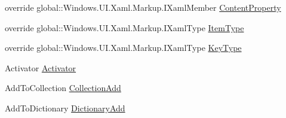 \begin{CompactItemize}
\item 
override global::Windows.UI.Xaml.Markup.IXamlMember \hyperlink{class__2doo_1_1_u_w_p_1_1__2doo___u_w_p___xaml_type_info_1_1_xaml_user_type_d0c85afa9c18e71a3d2850f49873bd0c}{ContentProperty}
\item 
override global::Windows.UI.Xaml.Markup.IXamlType \hyperlink{class__2doo_1_1_u_w_p_1_1__2doo___u_w_p___xaml_type_info_1_1_xaml_user_type_6c8b29ce9e51ab0c845f131f8e6e9f98}{ItemType}
\item 
override global::Windows.UI.Xaml.Markup.IXamlType \hyperlink{class__2doo_1_1_u_w_p_1_1__2doo___u_w_p___xaml_type_info_1_1_xaml_user_type_ab70ce45012ade9ca21825136d066410}{KeyType}
\item 
Activator \hyperlink{class__2doo_1_1_u_w_p_1_1__2doo___u_w_p___xaml_type_info_1_1_xaml_user_type_aec8bf9d82d32de8ec3a338ac1a4d641}{Activator}
\item 
AddToCollection \hyperlink{class__2doo_1_1_u_w_p_1_1__2doo___u_w_p___xaml_type_info_1_1_xaml_user_type_59a717ad24efc37521ee5641ce8bcd83}{CollectionAdd}
\item 
AddToDictionary \hyperlink{class__2doo_1_1_u_w_p_1_1__2doo___u_w_p___xaml_type_info_1_1_xaml_user_type_8296e230a21290dc57a45f996baa74d3}{DictionaryAdd}
\end{CompactItemize}
